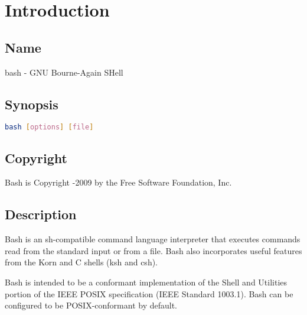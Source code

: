 \section{Introduction}
\subsection{Name}
bash - GNU Bourne-Again SHell

\subsection{Synopsis}
\label{sec:synopsis}
\noindent
\begin{lstlisting}[language=bash]
  bash [options] [file]
\end{lstlisting}

\subsection{Copyright}
Bash is Copyright -2009 by the Free Software Foundation, Inc.

\subsection{Description}
\label{sec:description}
 
Bash is an sh-compatible command language interpreter that executes commands read from the standard input or from a file. Bash also incorporates useful features from the Korn and C shells (ksh and csh).

Bash is intended to be a conformant implementation of the Shell and Utilities portion of the IEEE POSIX specification (IEEE Standard 1003.1). Bash can be configured to be POSIX-conformant by default.